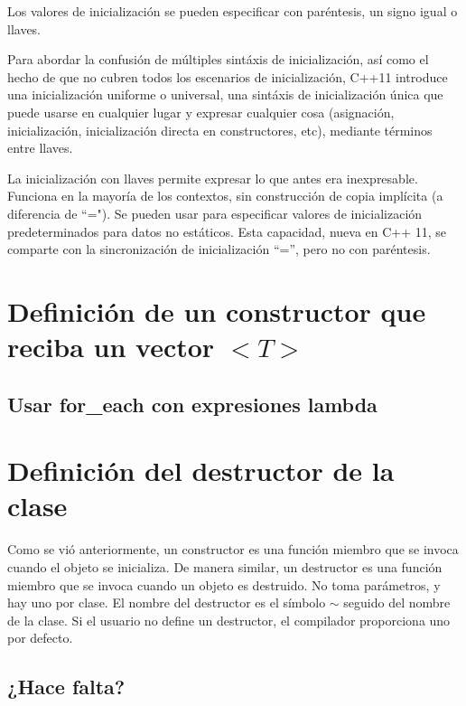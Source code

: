 \documentclass[10pt]{article}
\begin{document}
Los valores de inicialización se pueden especificar con paréntesis, un signo igual o llaves.

Para abordar la confusión de múltiples sint\'axis de inicialización, así como el hecho de que no cubren todos los escenarios de inicialización, C++11 introduce una inicialización uniforme o universal, una sint\'axis de inicialización única que puede usarse en cualquier lugar y expresar cualquier cosa (asignación, inicialización, inicialización directa en constructores, etc), mediante t\'erminos entre llaves.

La inicialización con llaves permite expresar lo que antes era inexpresable. Funciona en la mayoría de los contextos, sin construcción de copia implícita (a diferencia de ``="). Se pueden usar para especificar valores de inicialización predeterminados para datos no estáticos. Esta capacidad, nueva en C++ 11, se comparte con la sincronización de inicialización “=”, pero no con paréntesis. 

\vspace{2em}
\section{Definici\'on de  un constructor que reciba un vector $ <T> $}

\subsection{Usar for\_each con expresiones lambda}



\vspace{2em}
\section{Definici\'on del destructor de la clase}

Como se vi\'o anteriormente, un constructor es una función miembro que se invoca cuando el objeto se inicializa. De manera similar, un destructor es una función miembro que se invoca cuando un objeto es destruido. No toma parámetros, y hay uno por clase. El nombre del destructor es el s\'imbolo $ \sim $ seguido del nombre de la clase. Si el usuario no define un destructor, el compilador proporciona uno por defecto.



\subsection{¿Hace falta?}
\end{document}

